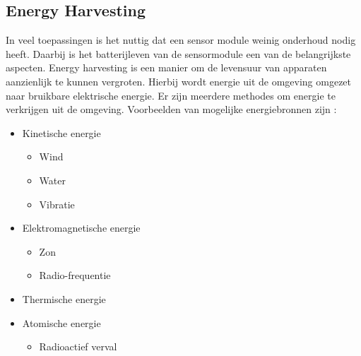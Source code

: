 \subsection{Energy Harvesting}
In veel toepassingen is het nuttig dat een sensor module weinig onderhoud nodig heeft. Daarbij is het batterijleven van de sensormodule een van de belangrijkste aspecten. Energy harvesting is een manier om de levensuur van apparaten aanzienlijk te kunnen vergroten. Hierbij wordt energie uit de omgeving omgezet naar bruikbare elektrische energie. Er zijn meerdere methodes om energie te verkrijgen uit de omgeving. Voorbeelden van mogelijke energiebronnen zijn \cite{energyHarvesting}:
\begin{itemize}
    \item Kinetische energie
    \begin{itemize}
        \item Wind
        \item Water
        \item Vibratie
    \end{itemize}
    \item Elektromagnetische energie
    \begin{itemize}
        \item Zon
        \item Radio-frequentie
    \end{itemize}
    \item Thermische energie
    \item Atomische energie
    \begin{itemize}
        \item Radioactief verval
    \end{itemize}
\end{itemize} 
